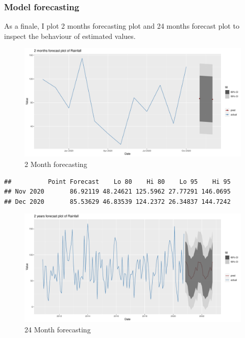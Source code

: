 \documentclass[
  11pt,
]{article}
\begin{document}
\newpage
\newpage

\hypertarget{model-forecasting-1}{%
\subsubsection{Model forecasting}\label{model-forecasting-1}}

As a finale, I plot 2 months forecasting plot and 24 months forecast
plot to inspect the behaviour of estimated values.

\begin{figure}
\centering
\includegraphics{ST422_files/figure-latex/unnamed-chunk-27-1.pdf}
\caption{2 Month forecasting}
\end{figure}

\begin{verbatim}
##          Point Forecast    Lo 80    Hi 80    Lo 95    Hi 95
## Nov 2020       86.92119 48.24621 125.5962 27.77291 146.0695
## Dec 2020       85.53629 46.83539 124.2372 26.34837 144.7242
\end{verbatim}

\begin{figure}
\centering
\includegraphics{ST422_files/figure-latex/unnamed-chunk-28-1.pdf}
\caption{24 Month forecasting}
\end{figure}
\end{document}
